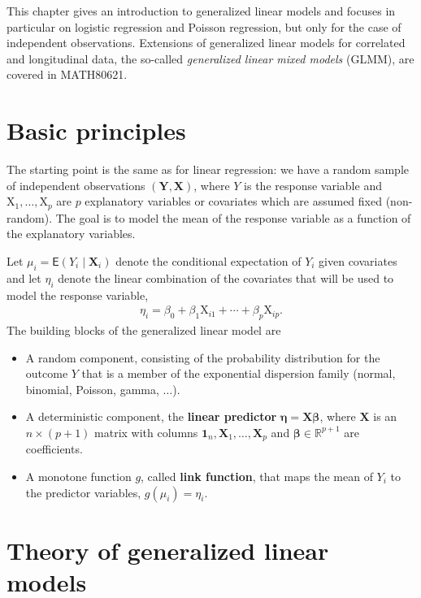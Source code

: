 \documentclass[
  11pt,
  letterpaper,
]{book}
\providecommand{\tightlist}{%
  \setlength{\itemsep}{0pt}\setlength{\parskip}{0pt}}
\theoremstyle{definition}
\theoremstyle{definition}
\theoremstyle{definition}
\theoremstyle{definition}
\theoremstyle{remark}
\begin{document}
This chapter gives an introduction to generalized linear models and
focuses in particular on logistic regression and Poisson regression, but
only for the case of independent observations. Extensions of generalized
linear models for correlated and longitudinal data, the so-called
\emph{generalized linear mixed models} (GLMM), are covered in MATH80621.

\hypertarget{basic-principles}{%
\section{Basic principles}\label{basic-principles}}

The starting point is the same as for linear regression: we have a
random sample of independent observations
\((\boldsymbol{Y}, \mathbf{X})\), where \(Y\) is the response variable and
\(\mathrm{X}_1, \ldots, \mathrm{X}_p\) are \(p\) explanatory variables or
covariates which are assumed fixed (non-random). The goal is to model
the mean of the response variable as a function of the explanatory
variables.

Let \(\mu_i=\mathsf{E}(Y_i \mid \mathbf{X}_i)\) denote the conditional
expectation of \(Y_i\) given covariates and let \(\eta_i\) denote the linear
combination of the covariates that will be used to model the response
variable,
\begin{align*}
\eta_i=\beta_0 + \beta_1 \mathrm{X}_{i1} + \cdots + \beta_p \mathrm{X}_{ip}.
\end{align*}
The building blocks of the generalized linear model are

\begin{itemize}
\tightlist
\item
  A random component, consisting of the probability distribution for the outcome \(Y\) that is a member of the exponential dispersion family (normal, binomial, Poisson, gamma, \(\ldots\)).
\item
  A deterministic component, the \textbf{linear predictor} \(\boldsymbol{\eta}=\mathbf{X} \boldsymbol{\beta}\), where \(\mathbf{X}\) is an \(n\times (p+1)\) matrix with columns \(\mathbf{1}_n, \mathbf{X}_1, \ldots, \mathbf{X}_p\) and \(\boldsymbol{\beta} \in \mathbb{R}^{p+1}\) are coefficients.
\item
  A monotone function \(g\), called \textbf{link function}, that maps the mean of \(Y_i\) to the predictor variables, \(g(\mu_i)=\eta_i\).
\end{itemize}

\hypertarget{theory-of-generalized-linear-models}{%
\section{Theory of generalized linear models}\label{theory-of-generalized-linear-models}}
\end{document}

